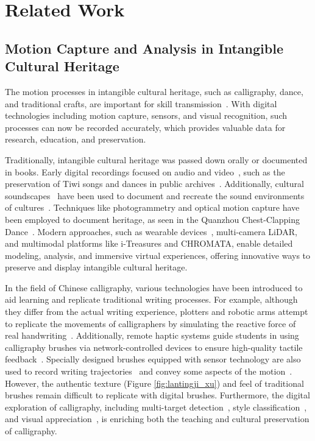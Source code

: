 \section{Related Work}
\subsection{Motion Capture and Analysis in Intangible Cultural Heritage}
The motion processes in intangible cultural heritage, such as calligraphy, dance, and traditional crafts, are important for skill transmission~\cite{bortolotto2007objects, lenzerini2011intangible, vecco2010definition}. With digital technologies including motion capture, sensors, and visual recognition, such processes can now be recorded accurately, which provides valuable data for research, education, and preservation.

Traditionally, intangible cultural heritage was passed down orally or documented in books. Early digital recordings focused on audio and video~\cite{pietrobruno2009cultural}, such as the preservation of Tiwi songs and dances in public archives~\cite{inbook}. Additionally, cultural soundscapes~\cite{samuels2010soundscapes} have been used to document and recreate the sound environments of cultures~\cite{noviandri2023cultural, Bartalucci_2020, doi:10.1080/13527258.2016.1138237}. Techniques like photogrammetry and optical motion capture have been employed to document heritage, as seen in the Quanzhou Chest-Clapping Dance~\cite{kirchhofer2011cultural, chen2014}. Modern approaches, such as wearable devices~\cite{protopapadakis2020digitizing}, multi-camera LiDAR\cite{caterina_balletti__2023}, and multimodal platforms like i-Treasures\cite{8255779} and CHROMATA, enable detailed modeling, analysis, and immersive virtual experiences\cite{9480948, selmanovic2018vr}, offering innovative ways to preserve and display intangible cultural heritage.

In the field of Chinese calligraphy, various technologies have been introduced to aid learning and replicate traditional writing processes. For example, although they differ from the actual writing experience, plotters and robotic arms attempt to replicate the movements of calligraphers by simulating the reactive force of real handwriting~\cite{nishino2011calligraphy, 10.1145/3613904.3642792, 10.1145/3526114.3558657}. Additionally, remote haptic systems guide students in using calligraphy brushes via network-controlled devices to ensure high-quality tactile feedback~\cite{10.1145/1255047.1255063}. Specially designed brushes equipped with sensor technology are also used to record writing trajectories~\cite{10.1145/3029798.3038422, Matsumaru_2017jaciii} and convey some aspects of the motion~\cite{10.1145/3559400.3565595}. However, the authentic texture (Figure \ref{fig:lantingji_xu}) and feel of traditional brushes remain difficult to replicate with digital brushes. Furthermore, the digital exploration of calligraphy, including multi-target detection~\cite{10.1007/978-981-15-3867-4_27}, style classification~\cite{10.1007/978-3-031-41685-9_5}, and visual appreciation~\cite{zhang2023visual}, is enriching both the teaching and cultural preservation of calligraphy. 


